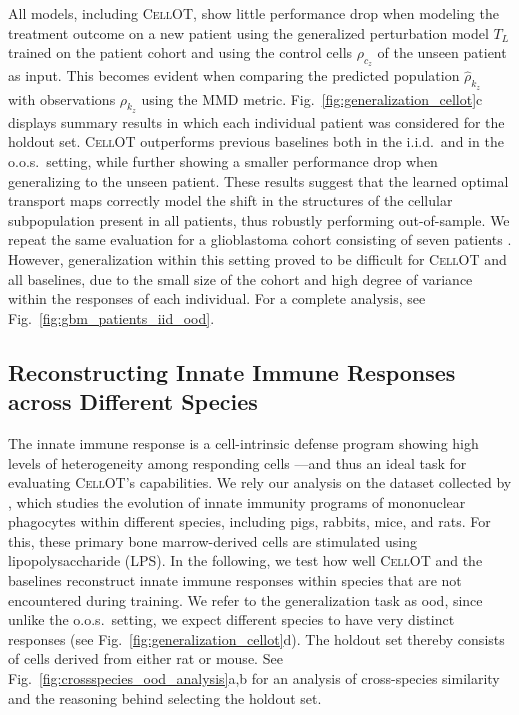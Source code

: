  All models, including \textsc{CellOT}, show little performance drop when modeling the treatment outcome on a new patient using the generalized perturbation model $T_L$ trained on the patient cohort and using the control cells $\rho_{c_z}$ of the unseen patient as input.
This becomes evident when comparing the predicted population $\hat{\rho}_{k_z}$ with observations $\rho_{k_z}$ using the \acrshort{MMD} metric. Fig.~\ref{fig:generalization_cellot}c displays summary results in which each individual patient was considered for the holdout set. \textsc{CellOT} outperforms previous baselines both in the i.i.d.~and in the o.o.s.~setting, while further showing a smaller performance drop when generalizing to the unseen patient.
These results suggest that the learned optimal transport maps correctly model the shift in the structures of the cellular subpopulation present in all patients, thus robustly performing out-of-sample.
We repeat the same evaluation for a glioblastoma cohort consisting of seven patients \citep{zhao2021deconvolution}. However, generalization within this setting proved to be difficult for \textsc{CellOT} and all baselines, due to the small size of the cohort and high degree of variance within the responses of each individual. 
For a complete analysis, see Fig.~\ref{fig:gbm_patients_iid_ood}.

\subsection{Reconstructing Innate Immune Responses across Different Species}

The innate immune response is a cell-intrinsic defense program showing high levels of heterogeneity among responding cells ---and thus an ideal task for evaluating \textsc{CellOT}'s capabilities. We rely our analysis on the dataset collected by \citet{hagai2018gene}, which studies the evolution of innate immunity programs of mononuclear phagocytes within different species, including pigs, rabbits, mice, and rats. For this, these primary bone marrow-derived cells are stimulated using lipopolysaccharide (LPS).
In the following, we test how well \textsc{CellOT} and the baselines reconstruct innate immune responses within species that are not encountered during training. We refer to the generalization task as \acrfull{ood}, since unlike the o.o.s.~setting, we expect different species to have very distinct responses (see Fig.~\ref{fig:generalization_cellot}d).
The holdout set thereby consists of cells derived from either rat or mouse. See Fig.~\ref{fig:crossspecies_ood_analysis}a,b for an analysis of cross-species similarity and the reasoning behind selecting the holdout set.

